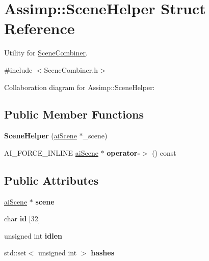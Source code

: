 \hypertarget{struct_assimp_1_1_scene_helper}{\section{Assimp\+:\+:Scene\+Helper Struct Reference}
\label{struct_assimp_1_1_scene_helper}
}


Utility for \hyperlink{class_assimp_1_1_scene_combiner}{Scene\+Combiner}.  




{\ttfamily \#include $<$Scene\+Combiner.\+h$>$}



Collaboration diagram for Assimp\+:\+:Scene\+Helper\+:
\subsection*{Public Member Functions}
\begin{DoxyCompactItemize}
\item 
\hypertarget{struct_assimp_1_1_scene_helper_a494def1cee5aee3098275b04acad6aa3}{{\bfseries Scene\+Helper} (\hyperlink{structai_scene}{ai\+Scene} $\ast$\+\_\+scene)}\label{struct_assimp_1_1_scene_helper_a494def1cee5aee3098275b04acad6aa3}

\item 
\hypertarget{struct_assimp_1_1_scene_helper_a8e1c98a2268f23363ef7818f7f923db1}{A\+I\+\_\+\+F\+O\+R\+C\+E\+\_\+\+I\+N\+L\+I\+N\+E \hyperlink{structai_scene}{ai\+Scene} $\ast$ {\bfseries operator-\/$>$} () const }\label{struct_assimp_1_1_scene_helper_a8e1c98a2268f23363ef7818f7f923db1}

\end{DoxyCompactItemize}
\subsection*{Public Attributes}
\begin{DoxyCompactItemize}
\item 
\hypertarget{struct_assimp_1_1_scene_helper_a87029a59f6a08573bee6c80659f3a2e9}{\hyperlink{structai_scene}{ai\+Scene} $\ast$ {\bfseries scene}}\label{struct_assimp_1_1_scene_helper_a87029a59f6a08573bee6c80659f3a2e9}

\item 
\hypertarget{struct_assimp_1_1_scene_helper_a3ce2b197cc27b22619ce5096e037bd6c}{char {\bfseries id} \mbox{[}32\mbox{]}}\label{struct_assimp_1_1_scene_helper_a3ce2b197cc27b22619ce5096e037bd6c}

\item 
\hypertarget{struct_assimp_1_1_scene_helper_a3853430382eab7d36d6dcee26e4ab883}{unsigned int {\bfseries idlen}}\label{struct_assimp_1_1_scene_helper_a3853430382eab7d36d6dcee26e4ab883}

\item 
\hypertarget{struct_assimp_1_1_scene_helper_ad9ea0d3ab7f5634fdc2699efd1494fbb}{std\+::set$<$ unsigned int $>$ {\bfseries hashes}}\label{struct_assimp_1_1_scene_helper_ad9ea0d3ab7f5634fdc2699efd1494fbb}

\end{DoxyCompactItemize}


